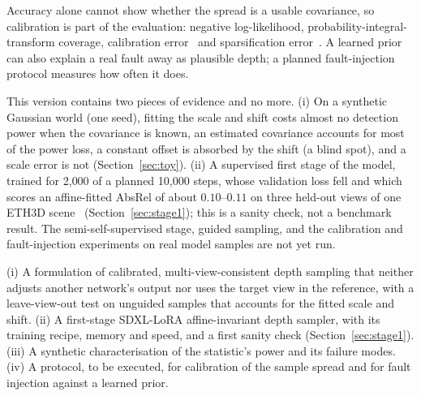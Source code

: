 Accuracy alone cannot show whether the spread is a usable covariance, so calibration is part of the evaluation: negative log-likelihood, probability-integral-transform coverage, calibration error~\cite{kuleshov2018calibrated,gneiting2007scoring} and sparsification error~\cite{ilg2018uncertainty}.
A learned prior can also explain a real fault away as plausible depth; a planned fault-injection protocol measures how often it does.

This version contains two pieces of evidence and no more.
(i) On a synthetic Gaussian world (one seed), fitting the scale and shift costs almost no detection power when the covariance is known, an estimated covariance accounts for most of the power loss, a constant offset is absorbed by the shift (a blind spot), and a scale error is not (Section~\ref{sec:toy}).
(ii) A supervised first stage of the model, trained for 2{,}000 of a planned 10{,}000 steps, whose validation loss fell and which scores an affine-fitted AbsRel of about $0.10$--$0.11$ on three held-out views of one ETH3D scene~\cite{schoeps2017eth3d} (Section~\ref{sec:stage1}); this is a sanity check, not a benchmark result.
The semi-self-supervised stage, guided sampling, and the calibration and fault-injection experiments on real model samples are not yet run.

(i) A formulation of calibrated, multi-view-consistent depth sampling that neither adjusts another network's output nor uses the target view in the reference, with a leave-view-out test on unguided samples that accounts for the fitted scale and shift.
(ii) A first-stage SDXL-LoRA affine-invariant depth sampler, with its training recipe, memory and speed, and a first sanity check (Section~\ref{sec:stage1}).
(iii) A synthetic characterisation of the statistic's power and its failure modes.
(iv) A protocol, to be executed, for calibration of the sample spread and for fault injection against a learned prior.
